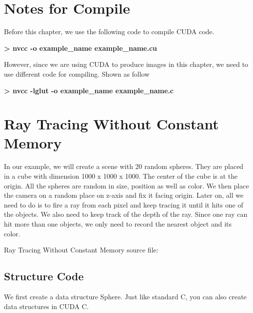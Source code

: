 \documentclass[letterpaper,10pt,openany,oneside]{sphinxmanual}
\begin{document}
\section{Notes for Compile}
\label{RTACM/RTACM:notes-for-compile}
Before this chapter, we use the following code to compile CUDA code.

\textbf{\textgreater{} nvcc -o example\_name example\_name.cu}

However, since we are using CUDA to produce images in this chapter, we need to use different code for compiling. Shown as follow

\textbf{\textgreater{} nvcc -lglut -o example\_name example\_name.c}


\section{Ray Tracing Without Constant Memory}
\label{RTACM/RTACM:ray-tracing-without-constant-memory}
In our example, we will create a scene with 20 random spheres. They are placed in a cube with dimension 1000 x 1000 x 1000. The center of the cube is at the origin. All the spheres are random in size, position as well as color. We then place the camera on a random place on z-axis and fix it facing origin. Later on, all we need to do is to fire a ray from each pixel and keep tracing it until it hits one of the objects. We also need to keep track of the depth of the ray. Since one ray can hit more than one objects, we only need to record the nearest object and its color.

Ray Tracing Without Constant Memory source file:


\subsection{Structure Code}
\label{RTACM/RTACM:structure-code}
We first create a data structure Sphere. Just like standard C, you can also create data structures in CUDA C.
\end{document}
